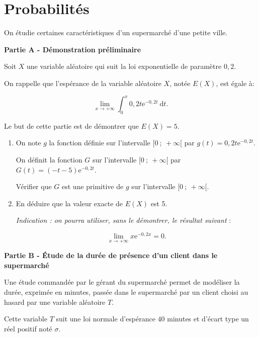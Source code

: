\documentclass{cornouaille}
\begin{document}

\tableofcontents
\section{Probabilités}
\begin{exercice}


On étudie certaines caractéristiques d'un supermarché d'une petite ville.

\bigskip

\textbf{Partie A - Démonstration préliminaire}

\medskip

Soit $X$ une variable aléatoire qui suit la loi exponentielle de paramètre $0,2$.

On rappelle que l'espérance de la variable aléatoire $X$, notée $E(X)$, est égale à:

\[\displaystyle\lim_{x \to + \infty}\displaystyle\int_{0}^{x}  0,2t\text{e}^{-0,2t}\:\text{d}t.\]

Le but de cette partie est de démontrer que $E(X) = 5$.

\medskip

\begin{enumerate}
\item On note $g$ la fonction définie sur l'intervalle $[0~;~+\infty[$ par $g(t) = 0,2t\text{e}^{-0,2t}$.

On définit la fonction $G$ sur l'intervalle $[0~;~+\infty[$ par $G(t) = (- t - 5)\text{e}^{-0,2t}$.

Vérifier que $G$ est une primitive de $g$ sur l'intervalle $[0~;~+\infty[$.
\item  En déduire que la valeur exacte de $E(X)$ est 5.

\emph{Indication : on pourra utiliser, sans le démontrer, le résultat suivant }:

\[\displaystyle\lim_{x \to + \infty} x \text{e}^{- 0,2x} = 0.\]
\end{enumerate}

\bigskip

\textbf{Partie B - Étude de la durée de présence d'un client dans le supermarché}

\medskip

Une étude commandée par le gérant du supermarché permet de modéliser la durée, exprimée en
minutes, passée dans le supermarché par un client choisi au hasard par une variable aléatoire $T$.

Cette variable $T$ suit une loi normale d'espérance $40$ minutes et d'écart type un réel positif noté $\sigma$.


\end{exercice}
\end{document}
